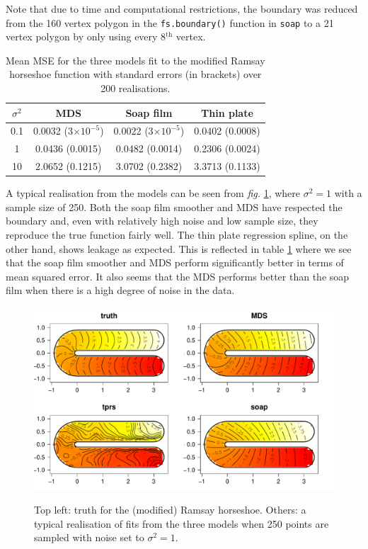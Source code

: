 \documentclass[a4paper,10pt]{article}
\newcommand{\fig}[1]{\emph{fig.} \ref{#1}}
\newcommand{\cross}{\times}
\begin{document}
Note that due to time and computational restrictions, the boundary was reduced from the 160 vertex polygon in the \texttt{fs.boundary()} function in \texttt{soap} to a 21 vertex polygon by only using every 8$^\text{th}$ vertex.

\begin{table}[ht]
\centering
\begin{tabular}{c || c c c}
$\sigma^2$ & MDS & Soap film & Thin plate\\ 
\hline
0.1  & 0.0032 (3$\cross10^{-5}$) & 0.0022 (3$\cross10^{-5}$) & 0.0402 (0.0008)\\ 
1  & 0.0436 (0.0015) & 0.0482 (0.0014) & 0.2306 (0.0024)\\ 
10  & 2.0652 (0.1215) & 3.0702 (0.2382) & 3.3713 (0.1133)\\ 
\end{tabular}
\caption{Mean MSE for the three models fit to the modified Ramsay horseshoe function with standard errors (in brackets) over 200 realisations.}
\label{ramsayresultstable}
\end{table}

A typical realisation from the models can be seen from \fig{ramsay-fit-1}, where $\sigma^2=1$ with a sample size of 250. Both the soap film smoother and MDS have respected the boundary and, even with relatively high noise and low sample size, they reproduce the true function fairly well. The thin plate regression spline, on the other hand, shows leakage as expected. This is reflected in table \ref{ramsayresultstable} where we see that the soap film smoother and MDS perform significantly better in terms of mean squared error. It also seems that the MDS performs better than the soap film when there is a high degree of noise in the data.


\begin{figure}
\centering
\includegraphics[width=6in]{figs/ramsay-fit-1.pdf} \\
\caption{Top left: truth for the (modified) Ramsay horseshoe. Others: a typical realisation of fits from the three models when 250 points are sampled with noise set to $\sigma^2=1$.}
\label{ramsay-fit-1}
\end{figure}
\end{document}
